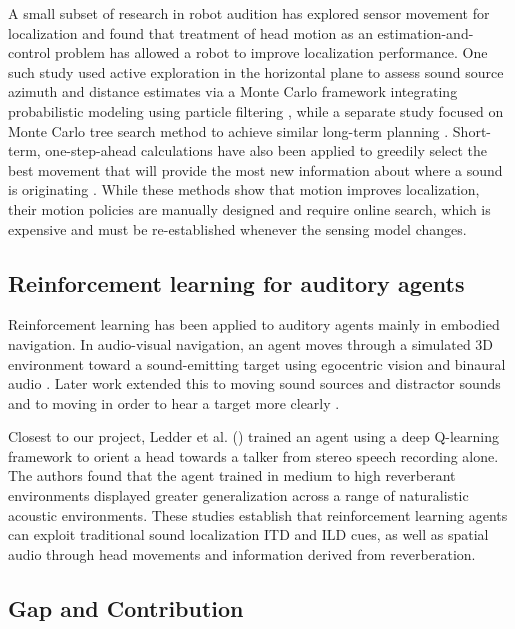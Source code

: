 \documentclass{article}
\begin{document}
A small subset of research in robot audition has explored sensor movement for localization and found that treatment of head motion as an estimation-and-control problem has allowed a robot to improve localization performance. One such study used active exploration in the horizontal plane to assess sound source azimuth and distance estimates via a Monte Carlo framework integrating probabilistic modeling using particle filtering \cite{schymura2017monte}, while a separate study focused on Monte Carlo tree search method to achieve similar long-term planning \cite{Nguyen2017mcts}. Short-term, one-step-ahead calculations have also been applied to greedily select the best movement that will provide the most new information about where a sound is originating \cite{bustamante2016one}. While these methods show that motion improves localization, their motion policies are manually designed and require online search, which is expensive and must be re-established whenever the sensing model changes.

\subsection{Reinforcement learning for auditory agents}

Reinforcement learning has been applied to auditory agents mainly in embodied
navigation. In audio-visual navigation, an agent moves through a simulated 3D
environment toward a sound-emitting target using egocentric vision and binaural
audio \cite{chen2020soundspaces}. Later work extended this to moving sound sources and distractor sounds \cite{younes2023catch} and to moving in order to hear a target more clearly \cite{majumder2021move2hear}.

Closest to our project, Ledder et al. (\cite{ledder2025audio}) trained an agent using a deep Q-learning framework to orient a head towards a talker from stereo speech recording alone. The authors found that the agent trained in medium to high reverberant environments displayed greater generalization across a range of naturalistic acoustic environments. These studies establish that reinforcement learning agents can exploit traditional sound localization ITD and ILD cues, as well as spatial audio through head movements and information derived from reverberation.

\subsection{Gap and Contribution}
\end{document}
